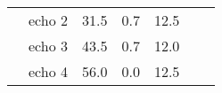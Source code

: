 \begin{table}[H]
{\begin{tabular}{|c|c|r|r|r|r|r|}
                                                                                 & echo 2   & 31.5                                                                               & 0.7                                                                                   & 12.5                                                                               &                                                                                           &                                                                                           \\ \cline{2-5}
                                                                                 & echo 3   & 43.5                                                                               & 0.7                                                                                   & 12.0                                                                               &                                                                                           &                                                                                           \\ \cline{2-5}
                                                                                 & echo 4   & 56.0                                                                               & 0.0                                                                                   & 12.5                                                                               &                                                                                           &                                                                                           \\ \hline
    \end{tabular}%
    }
    \end{table}